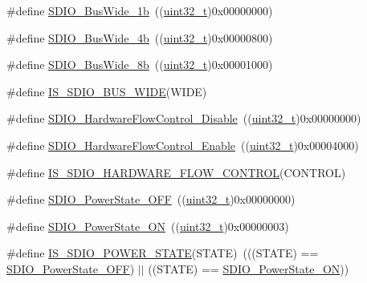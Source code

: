 \begin{DoxyCompactItemize}
\#define \hyperlink{group___s_d_i_o___bus___wide_ga9c333b57937c5cc0a173a58519f9250a}{S\+D\+I\+O\+\_\+\+Bus\+Wide\+\_\+1b}~((\hyperlink{_p_e___types_8h_a33594304e786b158f3fb30289278f5af}{uint32\+\_\+t})0x00000000)
\item 
\#define \hyperlink{group___s_d_i_o___bus___wide_ga79815d1d798b28a2d3750ad25466ff1b}{S\+D\+I\+O\+\_\+\+Bus\+Wide\+\_\+4b}~((\hyperlink{_p_e___types_8h_a33594304e786b158f3fb30289278f5af}{uint32\+\_\+t})0x00000800)
\item 
\#define \hyperlink{group___s_d_i_o___bus___wide_ga4d864f5c4e1af298146afc1d680081e9}{S\+D\+I\+O\+\_\+\+Bus\+Wide\+\_\+8b}~((\hyperlink{_p_e___types_8h_a33594304e786b158f3fb30289278f5af}{uint32\+\_\+t})0x00001000)
\item 
\#define \hyperlink{group___s_d_i_o___bus___wide_gaa5c6ad922117d5df3213631bf68fde5b}{I\+S\+\_\+\+S\+D\+I\+O\+\_\+\+B\+U\+S\+\_\+\+W\+I\+DE}(W\+I\+DE)
\item 
\#define \hyperlink{group___s_d_i_o___hardware___flow___control_ga7529a3c8a11ac685bde4aafa12c8a977}{S\+D\+I\+O\+\_\+\+Hardware\+Flow\+Control\+\_\+\+Disable}~((\hyperlink{_p_e___types_8h_a33594304e786b158f3fb30289278f5af}{uint32\+\_\+t})0x00000000)
\item 
\#define \hyperlink{group___s_d_i_o___hardware___flow___control_gab6cfef6778d829f3dcefc6c2bad7c9aa}{S\+D\+I\+O\+\_\+\+Hardware\+Flow\+Control\+\_\+\+Enable}~((\hyperlink{_p_e___types_8h_a33594304e786b158f3fb30289278f5af}{uint32\+\_\+t})0x00004000)
\item 
\#define \hyperlink{group___s_d_i_o___hardware___flow___control_gad8be549f8348479d064dff21343ae411}{I\+S\+\_\+\+S\+D\+I\+O\+\_\+\+H\+A\+R\+D\+W\+A\+R\+E\+\_\+\+F\+L\+O\+W\+\_\+\+C\+O\+N\+T\+R\+OL}(C\+O\+N\+T\+R\+OL)
\item 
\#define \hyperlink{group___s_d_i_o___power___state_gab2f36a68fc50795ea74a7e98b4ac2d37}{S\+D\+I\+O\+\_\+\+Power\+State\+\_\+\+O\+FF}~((\hyperlink{_p_e___types_8h_a33594304e786b158f3fb30289278f5af}{uint32\+\_\+t})0x00000000)
\item 
\#define \hyperlink{group___s_d_i_o___power___state_ga0aacd8c94effe8066c6d447fc884d217}{S\+D\+I\+O\+\_\+\+Power\+State\+\_\+\+ON}~((\hyperlink{_p_e___types_8h_a33594304e786b158f3fb30289278f5af}{uint32\+\_\+t})0x00000003)
\item 
\#define \hyperlink{group___s_d_i_o___power___state_gad0dae767c2024de1769efb1feccc14ef}{I\+S\+\_\+\+S\+D\+I\+O\+\_\+\+P\+O\+W\+E\+R\+\_\+\+S\+T\+A\+TE}(S\+T\+A\+TE)~(((S\+T\+A\+TE) == \hyperlink{openmotestm_2library_2inc_2stm32f10x__sdio_8h_ab2f36a68fc50795ea74a7e98b4ac2d37}{S\+D\+I\+O\+\_\+\+Power\+State\+\_\+\+O\+FF}) $\vert$$\vert$ ((S\+T\+A\+TE) == \hyperlink{openmotestm_2library_2inc_2stm32f10x__sdio_8h_a0aacd8c94effe8066c6d447fc884d217}{S\+D\+I\+O\+\_\+\+Power\+State\+\_\+\+ON}))
$$
\end{DoxyCompactItemize}
